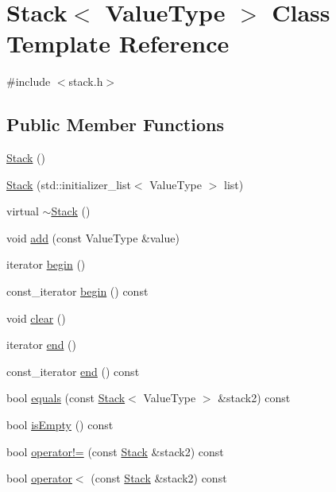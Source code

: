 \hypertarget{classStack}{}\section{Stack$<$ Value\+Type $>$ Class Template Reference}
\label{classStack}


{\ttfamily \#include $<$stack.\+h$>$}

\subsection*{Public Member Functions}
\begin{DoxyCompactItemize}
\item 
\mbox{\hyperlink{classStack_a7bda4597c418045448855db1ad87dbc5}{Stack}} ()
\item 
\mbox{\hyperlink{classStack_aecafaaaa5e02b2c138a10f6482963634}{Stack}} (std\+::initializer\+\_\+list$<$ Value\+Type $>$ list)
\item 
virtual \mbox{\hyperlink{classStack_ade4f41695c7ea04c2aec4babf349f280}{$\sim$\+Stack}} ()
\item 
void \mbox{\hyperlink{classStack_ab901606bf3a8019c986f0cf9a9f298dc}{add}} (const Value\+Type \&value)
\item 
iterator \mbox{\hyperlink{classStack_ad69bd11391be1a1dba5c8202259664f8}{begin}} ()
\item 
const\+\_\+iterator \mbox{\hyperlink{classStack_a29305669b60ca1680752e2fc3592ba99}{begin}} () const
\item 
void \mbox{\hyperlink{classStack_ac8bb3912a3ce86b15842e79d0b421204}{clear}} ()
\item 
iterator \mbox{\hyperlink{classStack_acad38d52497a975bfb6f2f6acd76631f}{end}} ()
\item 
const\+\_\+iterator \mbox{\hyperlink{classStack_accf9a4bd0c34d4a5f6a7dab66ea10cdc}{end}} () const
\item 
bool \mbox{\hyperlink{classStack_a8a06f9a4f35024fe7f29b0f87dd9a711}{equals}} (const \mbox{\hyperlink{classStack}{Stack}}$<$ Value\+Type $>$ \&stack2) const
\item 
bool \mbox{\hyperlink{classStack_acf82f9b2937375c7b1cf3dccb3df3312}{is\+Empty}} () const
\item 
bool \mbox{\hyperlink{classStack_a21017a086067b8ac1c21c3bdef97a100}{operator!=}} (const \mbox{\hyperlink{classStack}{Stack}} \&stack2) const
\item 
bool \mbox{\hyperlink{classStack_a6d1900aec1af12a907ad87301d464d2e}{operator$<$}} (const \mbox{\hyperlink{classStack}{Stack}} \&stack2) const

\end{DoxyCompactItemize}
